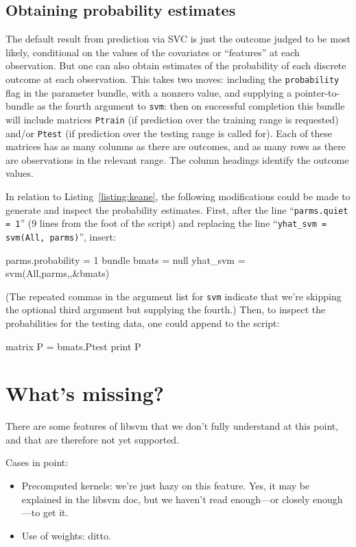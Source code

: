 \documentclass{article}
\begin{document}
\subsection{Obtaining probability estimates}
\label{sec:SVC-probs}

The default result from prediction via SVC is just the outcome judged
to be most likely, conditional on the values of the covariates or
``features'' at each observation. But one can also obtain estimates of
the probability of each discrete outcome at each observation. This
takes two moves: including the \texttt{probability} flag in the
parameter bundle, with a nonzero value, and supplying a
pointer-to-bundle as the fourth argument to \texttt{svm}: then on
successful completion this bundle will include matrices
\texttt{Ptrain} (if prediction over the training range is requested)
and/or \texttt{Ptest} (if prediction over the testing range is called
for). Each of these matrices has as many columns as there are
outcomes, and as many rows as there are observations in the relevant
range. The column headings identify the outcome values.

In relation to Listing~\ref{listing:keane}, the following
modifications could be made to generate and inspect the probability
estimates. First, after the line ``\texttt{parms.quiet = 1}'' (9 lines
from the foot of the script) and replacing the line
``\texttt{yhat\_svm = svm(All, parms)}'', insert:
%
\begin{code}
parms.probability = 1
bundle bmats = null
yhat_svm = svm(All,parms,,&bmats)
\end{code}
(The repeated commas in the argument list for \texttt{svm} indicate
that we're skipping the optional third argument but supplying the
fourth.) Then, to inspect the probabilities for the testing
data, one could append to the script:
%
\begin{code}
matrix P = bmats.Ptest
print P
\end{code}

\section{What's missing?}
\label{sec:missing}

There are some features of \textsf{libsvm} that we don't fully
understand at this point, and that are therefore not yet supported.

Cases in point:

\begin{itemize}
\item Precomputed kernels: we're just hazy on this feature. Yes, it
  may be explained in the \textsf{libsvm} doc, but we haven't read
  enough---or closely enough---to get it.
\item Use of weights: ditto.
\end{itemize}
\end{document}
